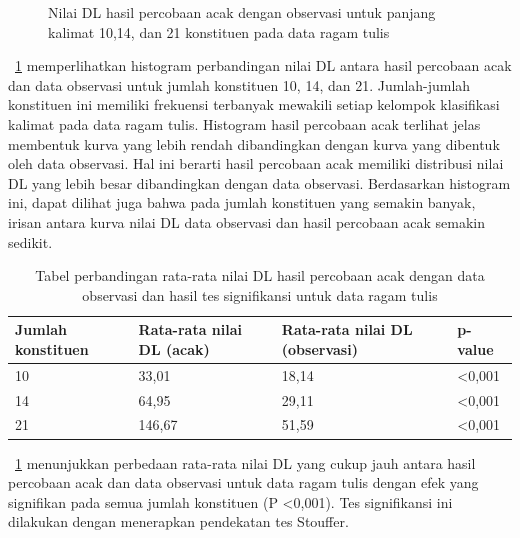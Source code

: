 \begin{figure}
\caption{Nilai DL hasil percobaan acak dengan observasi untuk panjang kalimat 10,14, dan 21 konstituen pada data ragam tulis}
\label{fig:trandomobs}
\end{figure}

\pic~\ref{fig:trandomobs} memperlihatkan histogram perbandingan nilai DL antara hasil percobaan acak dan data observasi untuk jumlah konstituen 10, 14, dan 21. Jumlah-jumlah konstituen ini memiliki frekuensi terbanyak mewakili setiap kelompok klasifikasi kalimat pada data ragam tulis.  Histogram hasil percobaan acak terlihat jelas membentuk kurva yang lebih rendah dibandingkan dengan kurva yang dibentuk oleh data observasi. Hal ini berarti hasil percobaan acak memiliki distribusi nilai DL yang lebih besar dibandingkan dengan data observasi. Berdasarkan histogram ini, dapat dilihat juga bahwa pada jumlah konstituen yang semakin banyak, irisan antara kurva nilai DL data observasi dan hasil percobaan acak semakin sedikit.

\begin{table}
\begin{center}
\begin{small}
  \caption{Tabel perbandingan rata-rata nilai DL hasil percobaan acak dengan data observasi dan hasil tes signifikansi untuk data ragam tulis}  \label{tab:perbandingan_DL_tulis}
  \begin{tabular}{ | l | l | l | l |}
    \hline
    	Jumlah konstituen & Rata-rata nilai DL (acak) & Rata-rata nilai DL (observasi) & p-value \\ \hline
	10 & 33,01 & 18,14 & \textless 0,001 \\ \hline
	14 & 64,95 & 29,11 & \textless 0,001 \\ \hline
	21 & 146,67 & 51,59 & \textless 0,001 \\ \hline
  \end{tabular}
  \end{small}
\end{center}
\end{table}

\tab~\ref{tab:perbandingan_DL_tulis} menunjukkan perbedaan rata-rata nilai DL yang cukup jauh antara hasil percobaan acak dan data observasi untuk data ragam tulis dengan efek yang signifikan pada semua jumlah konstituen (P \textless 0,001). Tes signifikansi ini dilakukan dengan menerapkan pendekatan tes Stouffer.

